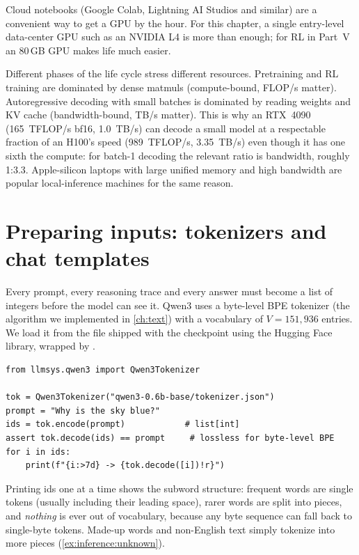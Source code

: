 Cloud notebooks (Google Colab, Lightning AI Studios and similar) are a convenient way to get a
GPU by the hour. For this chapter, a single entry-level data-center GPU such as an NVIDIA L4 is
more than enough; for RL in Part~V an 80\,GB GPU makes life much easier.

\begin{systemslens}
Different phases of the life cycle stress different resources. Pretraining and RL training are
dominated by dense matmuls (compute-bound, FLOP/s matter). Autoregressive decoding with small
batches is dominated by reading weights and KV cache (bandwidth-bound, TB/s matter). This is why
an RTX~4090 (\SI{165}{TFLOP/s} bf16, \SI{1.0}{TB/s}) can decode a small model at a respectable
fraction of an H100's speed (\SI{989}{TFLOP/s}, \SI{3.35}{TB/s}) even though it has one sixth the
compute: for batch-1 decoding the relevant ratio is bandwidth, roughly 1:3.3. Apple-silicon
laptops with large unified memory and high bandwidth are popular local-inference machines for the
same reason.
\end{systemslens}

\section{Preparing inputs: tokenizers and chat templates}\label{sec:inference:tokenizer}

Every prompt, every reasoning trace and every answer must become a list of integers before
the model can see it. Qwen3 uses a byte-level BPE tokenizer (the algorithm we implemented in
\cref{ch:text}) with a vocabulary of $V=151{,}936$ entries. We load it from the
 file shipped with the checkpoint using the Hugging Face 
library, wrapped by .

\begin{lstlisting}[caption={A tokenizer round trip.},label={lst:inference:roundtrip}]
from llmsys.qwen3 import Qwen3Tokenizer

tok = Qwen3Tokenizer("qwen3-0.6b-base/tokenizer.json")
prompt = "Why is the sky blue?"
ids = tok.encode(prompt)            # list[int]
assert tok.decode(ids) == prompt     # lossless for byte-level BPE
for i in ids:
    print(f"{i:>7d} -> {tok.decode([i])!r}")
\end{lstlisting}

Printing ids one at a time shows the subword structure: frequent words are single tokens (usually
including their leading space), rarer words are split into pieces, and \emph{nothing} is ever out of
vocabulary, because any byte sequence can fall back to single-byte tokens. Made-up words and
non-English text simply tokenize into more pieces (\cref{ex:inference:unknown}).

